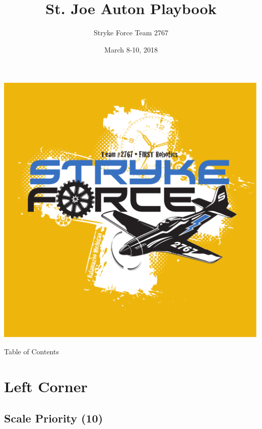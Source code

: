 \documentclass{beamer}
\title{St. Joe Auton Playbook}
\author{Stryke Force Team 2767}
\date{March 8-10, 2018}
\begin{document}
\begin{frame}
 \center\includegraphics[scale=0.15]{assets/strykeforce}
 \titlepage
\end{frame}
\begin{frame}[t]{Table of Contents}
 \tableofcontents
\end{frame}
\section{Left Corner}
\subsection{Scale Priority (10)}
\end{document}
